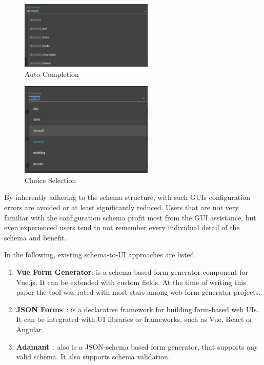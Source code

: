 \begin{figure}[!t]
\centering
\includegraphics[width=2.5in]{figures/gui_advantage_autocomplete}
\caption{Auto-Completion}
\label{fig:gui_advantage_autocomplete}
\end{figure}

\begin{figure}[!t]
\centering
\includegraphics[width=2.5in]{figures/gui_advantage_choiceselection}
\caption{Choice Selection}
\label{fig:gui_advantage_choiceselection}
\end{figure}

By inherently adhering to the schema structure, with such GUIs configuration errors are avoided or at least significantly reduced.
Users that are not very familiar with the configuration schema profit most from the GUI assistance, but even experienced users tend to not remember every individual detail of the schema and benefit.

In the following, existing schema-to-UI approaches are listed.


\begin{enumerate}[label=(\alph*)]
    \item \textbf{Vue Form Generator}\cite{vueformgenerator}: is a schema-based form generator component for Vue.js.
    It can be extended with custom fields.
    At the time of writing this paper the tool was rated with most stars among web form generator projects. %

    \item \textbf{JSON Forms}~\cite{JSONForms}: is a declarative framework for building form-based web UIs.
    It can be integrated with UI libraries or frameworks, such as Vue, React or Angular.

    \item \textbf{Adamant}~\cite{siffa2022adamant}: also is a JSON-schema based form generator, that supports any valid schema.
    It also supports schema validation.

\end{enumerate}

